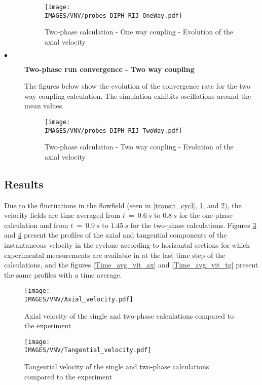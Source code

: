 \begin{description}
\begin{figure}[H]
\centerline{\texttt{[image: \\IMAGES/VNV/probes\_DIPH\_RIJ\_OneWay.pdf]}}
\caption{Two-phase calculation - One way coupling - Evolution of the axial velocity}
\label{transit_cycl_one_way}
\end{figure}

   \item[$\bullet$]\textbf{Two-phase run convergence - Two way coupling}

The figures below show the evolution of the convergence rate for the two way coupling calculation. The simulation exhibits oscillations around the mean values. 

\begin{figure}[H]
\centerline{\texttt{[image: \\IMAGES/VNV/probes\_DIPH\_RIJ\_TwoWay.pdf]}}
\caption{Two-phase calculation - Two way coupling - Evolution of the axial velocity}
\label{transit_cycl_two_way}
\end{figure}

\end{description}

\subsection{Results}

Due to the fluctuations in the flowfield (seen in \ref{transit_cycl}, \ref{transit_cycl_one_way}, and \ref{transit_cycl_two_way}), the velocity fields are time averaged from $t~=~0.6~s$ to $0.8~s$ for the one-phase calculation and from $t~=~0.9~s$ to $1.45~s$ for the two-phase calculations. Figures \ref{vit_ax} and \ref{vit_tg} present the profiles of the axial and tangential components of the instantaneous velocity in the cyclone according to horizontal sections for which experimental measurements are available in \cite{Boysan83} at the last time step of the calculations, and the figures \ref{Time_avg_vit_ax} and \ref{Time_avg_vit_tg} present the same profiles with a time average.

\begin{figure}[H]
\centerline{\texttt{[image: \\IMAGES/VNV/Axial\_velocity.pdf]}}
\caption{Axial velocity of the single and two-phase calculations compared to the experiment}
\label{vit_ax}
\end{figure}

\begin{figure}[H]
\centerline{\texttt{[image: \\IMAGES/VNV/Tangential\_velocity.pdf]}}
\caption{Tangential velocity of the single and two-phase calculations compared to the experiment}
\label{vit_tg}
\end{figure}

